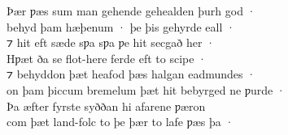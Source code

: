 \documentclass[10pt]{book}
\begin{document}
\begin{center}
{Þ\ae{}r ƿ\ae{}s sum man gehende gehealden þurh god · \\
behyd þam h\ae{}þenum · þe þis gehyrde eall · \\
⁊ hit eft s\ae{}de sƿa sƿa ƿe hit secgað her · \\
Hƿ\ae{}t ða se flot-here ferde eft to scipe · \\
⁊ behyddon þ\ae{}t heafod þ\ae{}s halgan eadmundes · \\
on þam þiccum bremelum þ\ae{}t hit bebyrged ne ƿurde · \\
Þa \ae{}fter fyrste syððan hi afarene ƿ\ae{}ron \\
com þ\ae{}t land-folc to þe þ\ae{}r to lafe ƿ\ae{}s þa · \\
}
\end{center}


\settowidth{}
\end{document}
